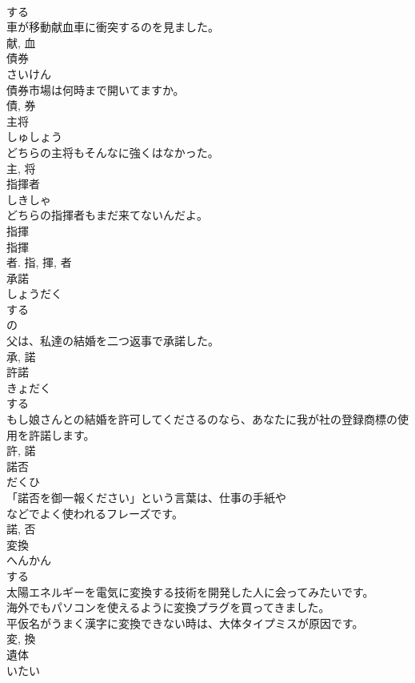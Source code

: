 \documentclass[8pt]{extreport}
\begin{document}
\begin{CJK}{UTF8}{min}
\\	する 
\\	車が移動献血車に衝突するのを見ました。	
\\	献, 血	
\\	債券	
\\	さいけん	
\\	債券市場は何時まで開いてますか。	
\\	債, 券	
\\	主将	
\\	しゅしょう	
\\	どちらの主将もそんなに強くはなかった。	
\\	主, 将	
\\	指揮者	
\\	しきしゃ	
\\	どちらの指揮者もまだ来てないんだよ。	
\\	指揮 
\\	指揮 
\\	者.	指, 揮, 者	
\\	承諾	
\\	しょうだく	
\\	する 
\\	の 
\\	父は、私達の結婚を二つ返事で承諾した。	
\\	承, 諾	
\\	許諾	
\\	きょだく	
\\	する 
\\	もし娘さんとの結婚を許可してくださるのなら、あなたに我が社の登録商標の使用を許諾します。	
\\	許, 諾	
\\	諾否	
\\	だくひ	
\\	「諾否を御一報ください」という言葉は、仕事の手紙や
\\	などでよく使われるフレーズです。	
\\	諾, 否	
\\	変換	
\\	へんかん	
\\	する 
\\	太陽エネルギーを電気に変換する技術を開発した人に会ってみたいです。	
\\	海外でもパソコンを使えるように変換プラグを買ってきました。	
\\	平仮名がうまく漢字に変換できない時は、大体タイプミスが原因です。	
\\	変, 換	
\\	遺体	
\\	いたい	

\end{CJK}
\end{document}
